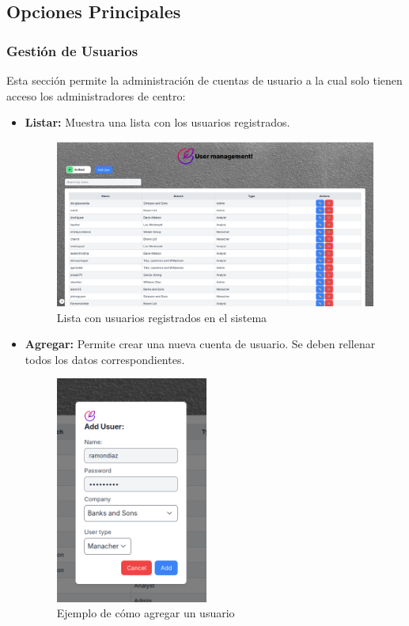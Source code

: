 \documentclass{article}
\begin{document}
\subsection{Opciones Principales}
\subsubsection{Gestión de Usuarios}
Esta sección permite la administración de cuentas de usuario a la cual solo tienen acceso los administradores de centro:

\begin{itemize}
    \item \textbf{Listar:} Muestra una lista con los usuarios registrados.
    
    \begin{figure}[h!]
        \centering
        \includegraphics[width= 12cm]{listar_users.png}
        \caption{Lista con usuarios registrados en el sistema}
    \end{figure}

    \item \textbf{Agregar:} Permite crear una nueva cuenta de usuario. Se deben rellenar todos los datos correspondientes.
    
    \begin{figure}[h!]
        \centering
        \includegraphics[width= 5cm]{add_user.png}
        \caption{Ejemplo de cómo agregar un usuario}
    \end{figure}


\end{itemize}
\end{document}
